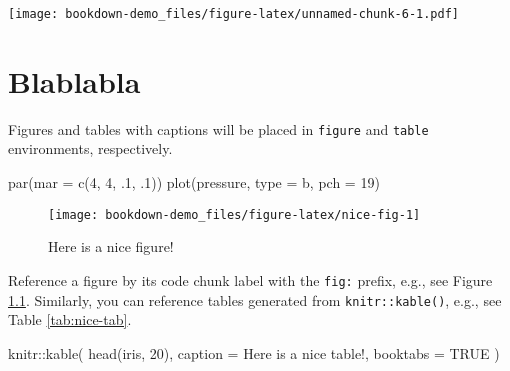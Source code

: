 \documentclass[
]{book}
\newenvironment{Shaded}{\begin{snugshade}}{\end{snugshade}}
\newcommand{\AttributeTok}[1]{\textcolor[rgb]{0.77,0.63,0.00}{#1}}
\newcommand{\ConstantTok}[1]{\textcolor[rgb]{0.00,0.00,0.00}{#1}}
\newcommand{\DecValTok}[1]{\textcolor[rgb]{0.00,0.00,0.81}{#1}}
\newcommand{\FunctionTok}[1]{\textcolor[rgb]{0.00,0.00,0.00}{#1}}
\newcommand{\NormalTok}[1]{#1}
\newcommand{\SpecialCharTok}[1]{\textcolor[rgb]{0.00,0.00,0.00}{#1}}
\newcommand{\StringTok}[1]{\textcolor[rgb]{0.31,0.60,0.02}{#1}}
\begin{document}
\texttt{[image: bookdown-demo\_files/figure-latex/unnamed-chunk-6-1.pdf]}

\hypertarget{blablabla}{%
\chapter{Blablabla}\label{blablabla}}

Figures and tables with captions will be placed in \texttt{figure} and \texttt{table} environments, respectively.

\begin{Shaded}
\begin{Highlighting}[]
\FunctionTok{par}\NormalTok{(}\AttributeTok{mar =} \FunctionTok{c}\NormalTok{(}\DecValTok{4}\NormalTok{, }\DecValTok{4}\NormalTok{, .}\DecValTok{1}\NormalTok{, .}\DecValTok{1}\NormalTok{))}
\FunctionTok{plot}\NormalTok{(pressure, }\AttributeTok{type =} \StringTok{\textquotesingle{}b\textquotesingle{}}\NormalTok{, }\AttributeTok{pch =} \DecValTok{19}\NormalTok{)}
\end{Highlighting}
\end{Shaded}

\begin{figure}

{\centering \texttt{[image: bookdown-demo\_files/figure-latex/nice-fig-1]} 

}

\caption{Here is a nice figure!}\label{fig:nice-fig}
\end{figure}

Reference a figure by its code chunk label with the \texttt{fig:} prefix, e.g., see Figure \ref{fig:nice-fig}. Similarly, you can reference tables generated from \texttt{knitr::kable()}, e.g., see Table \ref{tab:nice-tab}.

\begin{Shaded}
\begin{Highlighting}[]
\NormalTok{knitr}\SpecialCharTok{::}\FunctionTok{kable}\NormalTok{(}
  \FunctionTok{head}\NormalTok{(iris, }\DecValTok{20}\NormalTok{), }\AttributeTok{caption =} \StringTok{\textquotesingle{}Here is a nice table!\textquotesingle{}}\NormalTok{,}
  \AttributeTok{booktabs =} \ConstantTok{TRUE}
\NormalTok{)}
\end{Highlighting}
\end{Shaded}
\end{document}
